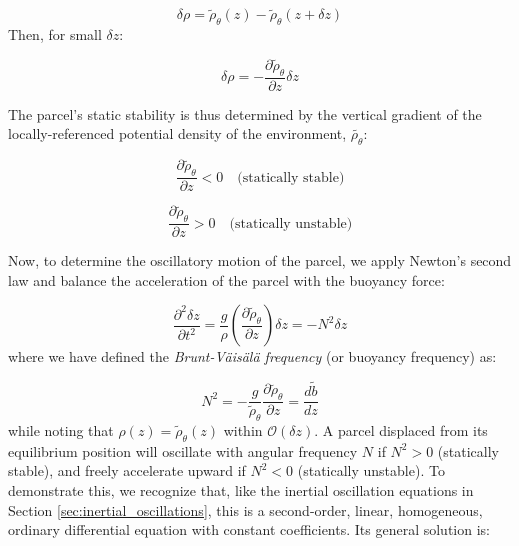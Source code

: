 \documentclass[12pt]{article}
\numberwithin{equation}{section}
\numberwithin{figure}{section}
\numberwithin{table}{section}
\begin{document}
\begin{equation}
  \delta \rho = \widetilde{\rho}_\theta(z) - \widetilde{\rho}_\theta(z + \delta z)
\end{equation}
Then, for small $\delta z$:

\begin{equation}
  \delta \rho = - \frac{\partial \widetilde{\rho}_\theta}{\partial z} \delta z
\end{equation}

The parcel's static stability is thus determined by the vertical gradient of
the locally-referenced potential density of the environment,
$\widetilde{\rho_\theta}$:

\begin{equation}
  \frac{\partial \widetilde{\rho}_\theta}{\partial z} < 0 \quad \text{(statically stable)}
\end{equation}

\begin{equation}
  \frac{\partial \widetilde{\rho}_\theta}{\partial z} > 0 \quad \text{(statically unstable)}
\end{equation}

Now, to determine the oscillatory motion of the parcel, we apply Newton's second
law and balance the acceleration of the parcel with the buoyancy force:

\begin{equation}
  \frac{\partial^2 \delta z}{\partial t^2} = \frac{g}{\rho} \left( \frac{\partial \widetilde{\rho}_\theta}{\partial z} \right) \delta z =
  - N^2 \delta z
\end{equation}
where we have defined the \textit{Brunt-Väisälä frequency}
(or buoyancy frequency) as:

\begin{equation}
  N^2 = - \frac{g}{\widetilde{\rho}_\theta} \frac{\partial \widetilde{\rho}_\theta}{\partial z} =
  \frac{d\widetilde{b}}{dz}
\end{equation}
while noting that $\rho(z) = \widetilde{\rho}_\theta(z)$ within
$\mathcal{O}(\delta z)$.
A parcel displaced from its equilibrium position will oscillate with angular
frequency $N$ if $N^2 > 0$ (statically stable), and freely accelerate
upward if $N^2 < 0$ (statically unstable).
To demonstrate this, we recognize that, like the inertial oscillation
equations in Section \ref{sec:inertial_oscillations}, this is a second-order,
linear, homogeneous, ordinary differential equation with constant coefficients.
Its general solution is:
\end{document}
